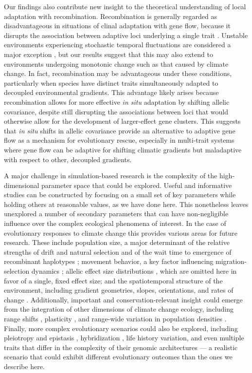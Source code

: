 \documentclass[9pt,twocolumn,twoside,lineno]{new_article}
\begin{document}
Our findings also contribute new insight to the theoretical understanding
of local adaptation with recombination.
Recombination is generally regarded as disadvantageous
in situations of clinal adaptation
with gene flow, because it disrupts the
association between adaptive loci 
underlying a single trait \cite{tigano}.
Unstable environments experiencing stochastic temporal fluctuations
are considered a major exception \cite{tigano},
but our results suggest that this may also extend
to environments undergoing monotonic change
such as that caused by climate change.
In fact, recombination may
be advantageous under these conditions,
particularly when species have distinct traits simultaneously adapted
to decoupled environmental gradients.
This advantage likely arises because recombination
allows for more effective \textit{in situ} adaptation
by shifting allelic covariance, despite 
still disrupting the associations between loci
that would otherwise allow for the development of
larger-effect gene clusters.
This suggests that \textit{in situ} shifts in allelic covariance
provide an alternative to adaptive gene flow as a mechanism for evolutionary rescue,
especially in multi-trait systems where gene flow can be adaptive
for shifting climatic gradients but maladaptive with
respect to other, decoupled gradients.

A major challenge in simulation-based research is the complexity of the high-dimensional 
parameter space that could be explored.
Useful and informative studies can be constructed by focusing on a small set of
key parameters while holding others at reasonable values, as we have done here.
This nonetheless leaves unexplored a number of secondary parameters
that can have non-negligible influence over the complex ecological phenomena of interest.
In the case of evolutionary responses to climate change
this provides various areas for future research.
These include
population size, a major determinant of the relative strengths of drift
and natural selection \cite{murray} and of the wait time to emergence of
recombinant haplotypes \cite{christiansen};
movement behavior, a key factor influencing
migration-selection dynamics \cite{wright,haldane,barton};
allelic effect size distributions \cite{orr},
which are omitted here in favor of a single, fixed effect size;
and the spatiotemporal structure of the environment,
including gradient geometries, slopes, orientations, and rates of change
\cite{benes}.
Additionally, important and conservation-relevant insight could emerge from the 
integration of other dimensions of climate change ecology, including range shifts 
\cite{weiss-lehman}, plasticity \cite{chevin},
and range-wide variation in population densities \cite{aitken_whitlock}.
Finally, more complex evolutionary scenarios could also be explored, including 
pleiotropy and epistasis \cite{thompson},
hybridization \cite{turbek}, life history variation,
and even multiple traits that differ in the
complexity of their genomic architectures --- a realistic
scenario that could exhibit different
evolutionary outcomes than the ones we describe here.
\end{document}
